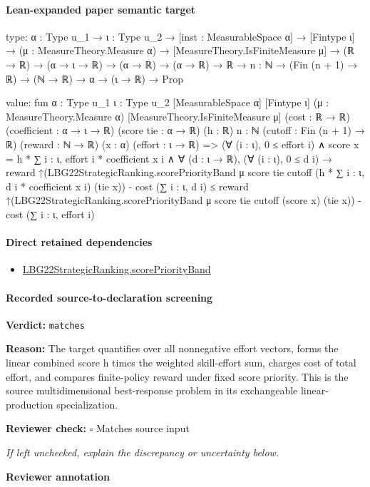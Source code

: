 \documentclass[10pt]{article}
\newcommand{\reviewerbox}{%
  \par\noindent\fbox{\parbox{0.96\linewidth}{\rule{0pt}{0.38in}}}\par
}
\newcommand{\reviewmatch}[1]{%
  \par\noindent\textbf{Reviewer check:} $\square$\; #1\par
  \noindent\emph{If left unchecked, explain the discrepancy or uncertainty below.}\par
}
\begin{document}
\paragraph{Lean-expanded paper semantic target}
\begin{ReviewVerbatim}
type:
{α : Type u_1} →
  {ι : Type u_2} →
    [inst : MeasurableSpace α] →
      [Fintype ι] →
        (μ : MeasureTheory.Measure α) →
          [MeasureTheory.IsFiniteMeasure μ] →
            (ℝ → ℝ) → (α → ι → ℝ) → (α → ℝ) → (α → ℝ) → ℝ → {n : ℕ} → (Fin (n + 1) → ℝ) → (ℕ → ℝ) → α → (ι → ℝ) → Prop

value:
fun {α : Type u_1} {ι : Type u_2} [MeasurableSpace α] [Fintype ι] (μ : MeasureTheory.Measure α)
    [MeasureTheory.IsFiniteMeasure μ] (cost : ℝ → ℝ) (coefficient : α → ι → ℝ) (score tie : α → ℝ) (h : ℝ) {n : ℕ}
    (cutoff : Fin (n + 1) → ℝ) (reward : ℕ → ℝ) (x : α) (effort : ι → ℝ) =>
  (∀ (i : ι), 0 ≤ effort i) ∧
    score x = h * ∑ i : ι, effort i * coefficient x i ∧
      ∀ (d : ι → ℝ),
        (∀ (i : ι), 0 ≤ d i) →
          reward
                ↑(LBG22StrategicRanking.scorePriorityBand μ score tie cutoff (h * ∑ i : ι, d i * coefficient x i)
                    (tie x)) -
              cost (∑ i : ι, d i) ≤
            reward ↑(LBG22StrategicRanking.scorePriorityBand μ score tie cutoff (score x) (tie x)) -
              cost (∑ i : ι, effort i)
\end{ReviewVerbatim}

\paragraph{Direct retained dependencies}
\begin{itemize}\raggedright
\item \hyperlink{governing-declaration-29f9270f1ab8f757}{LBG22\allowbreak{}Strategic\allowbreak{}Ranking.\allowbreak{}score\allowbreak{}Priority\allowbreak{}Band}
\end{itemize}
\paragraph{Recorded source-to-declaration screening}
\textbf{Verdict:} \texttt{matches}
\\
{\raggedright
\textbf{Reason:} The target quantifies over all nonnegative effort vectors, forms the linear combined score h times the weighted skill-\allowbreak{}effort sum, charges cost of total effort, and compares finite-\allowbreak{}policy reward under fixed score priority.\allowbreak{} This is the source multidimensional best-\allowbreak{}response problem in its exchangeable linear-\allowbreak{}production specialization.\allowbreak{}
\par}
\reviewmatch{Matches source input}
\noindent\textbf{Reviewer annotation}\par
\reviewerbox
\clearpage
\hypertarget{paper-prerequisite-b0c4f18b812a40f1}{}
\end{document}
